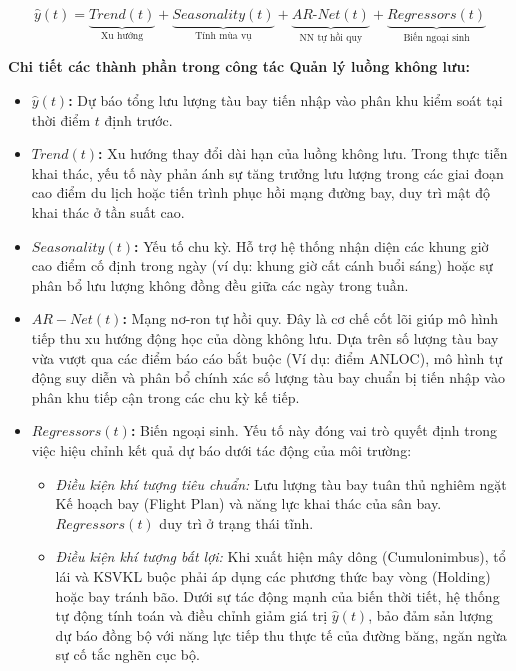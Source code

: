 \documentclass[12pt,a4paper]{article}
\begin{document}
\begin{equation}
\hat{y}(t) = \underbrace{Trend(t)}_{\text{Xu hướng}} + \underbrace{Seasonality(t)}_{\text{Tính mùa vụ}} + \underbrace{AR\text{-}Net(t)}_{\text{NN tự hồi quy}} + \underbrace{Regressors(t)}_{\text{Biến ngoại sinh}}
\end{equation}

\textbf{Chi tiết các thành phần trong công tác Quản lý luồng không lưu:}
\begin{itemize}
    \item \textbf{$\hat{y}(t)$:} Dự báo tổng lưu lượng tàu bay tiến nhập vào phân khu kiểm soát tại thời điểm $t$ định trước.
    \item \textbf{$Trend(t)$:} Xu hướng thay đổi dài hạn của luồng không lưu. Trong thực tiễn khai thác, yếu tố này phản ánh sự tăng trưởng lưu lượng trong các giai đoạn cao điểm du lịch hoặc tiến trình phục hồi mạng đường bay, duy trì mật độ khai thác ở tần suất cao.
    \item \textbf{$Seasonality(t)$:} Yếu tố chu kỳ. Hỗ trợ hệ thống nhận diện các khung giờ cao điểm cố định trong ngày (ví dụ: khung giờ cất cánh buổi sáng) hoặc sự phân bổ lưu lượng không đồng đều giữa các ngày trong tuần.
    \item \textbf{$AR-Net(t)$:} Mạng nơ-ron tự hồi quy. Đây là cơ chế cốt lõi giúp mô hình tiếp thu xu hướng động học của dòng không lưu. Dựa trên số lượng tàu bay vừa vượt qua các điểm báo cáo bắt buộc (Ví dụ: điểm ANLOC), mô hình tự động suy diễn và phân bổ chính xác số lượng tàu bay chuẩn bị tiến nhập vào phân khu tiếp cận trong các chu kỳ kế tiếp.
    \item \textbf{$Regressors(t)$:} Biến ngoại sinh. Yếu tố này đóng vai trò quyết định trong việc hiệu chỉnh kết quả dự báo dưới tác động của môi trường:
    \begin{itemize}
        \item \textit{Điều kiện khí tượng tiêu chuẩn:} Lưu lượng tàu bay tuân thủ nghiêm ngặt Kế hoạch bay (Flight Plan) và năng lực khai thác của sân bay. $Regressors(t)$ duy trì ở trạng thái tĩnh.
        \item \textit{Điều kiện khí tượng bất lợi:} Khi xuất hiện mây dông (Cumulonimbus), tổ lái và KSVKL buộc phải áp dụng các phương thức bay vòng (Holding) hoặc bay tránh bão. Dưới sự tác động mạnh của biến thời tiết, hệ thống tự động tính toán và điều chỉnh giảm giá trị $\hat{y}(t)$, bảo đảm sản lượng dự báo đồng bộ với năng lực tiếp thu thực tế của đường băng, ngăn ngừa sự cố tắc nghẽn cục bộ.
    \end{itemize}
\end{itemize}
\end{document}
